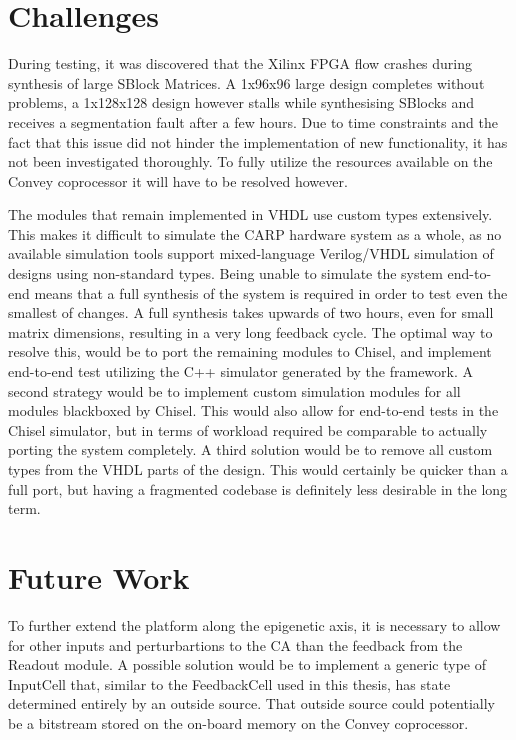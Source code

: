 \renewcommand{\arraystretch}{1}


\section{Challenges}

During testing, it was discovered that the Xilinx FPGA flow crashes during
synthesis of large SBlock Matrices. A 1x96x96 large design completes without
problems, a 1x128x128 design however stalls while synthesising SBlocks and
receives a segmentation fault after a few hours. Due to time constraints and the
fact that this issue did not hinder the implementation of new functionality, it
has not been investigated thoroughly. To fully utilize the resources available on the
Convey coprocessor it will have to be resolved however.

The modules that remain implemented in VHDL use custom types extensively. This
makes it difficult to simulate the CARP hardware system as a whole, as no
available simulation tools support mixed-language Verilog/VHDL simulation of
designs using non-standard types. Being unable to simulate the system end-to-end
means that a full synthesis of the system is required in order to test even the
smallest of changes. A full synthesis takes upwards of two hours, even for small
matrix dimensions, resulting in a very long feedback cycle. The optimal way to
resolve this, would be to port the remaining modules to Chisel, and implement
end-to-end test utilizing the C++ simulator generated by the framework. A second
strategy would be to implement custom simulation modules for all modules
blackboxed by Chisel. This would also allow for end-to-end tests in the Chisel
simulator, but in terms of workload required be comparable to actually porting
the system completely. A third solution would be to remove all custom types from
the VHDL parts of the design. This would certainly be quicker than a full port,
but having a fragmented codebase is definitely less desirable in the long term.

\section{Future Work}

To further extend the platform along the epigenetic axis, it is necessary to
allow for other inputs and perturbartions to the CA than the feedback from the
Readout module. A possible solution would be to implement a generic type of
InputCell that, similar to the FeedbackCell used in this thesis, has state
determined entirely by an outside source. That outside source could potentially
be a bitstream stored on the on-board memory on the Convey coprocessor.

